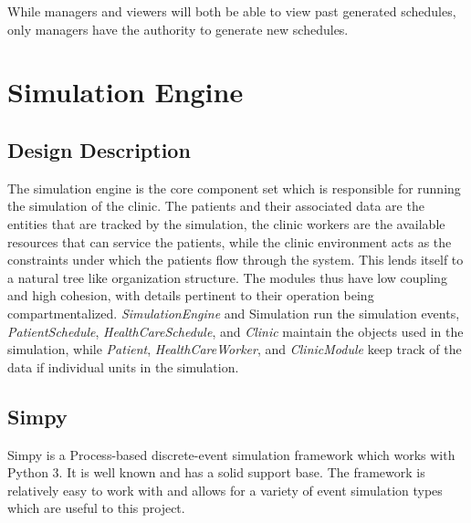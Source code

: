 \documentclass[12pt]{article}
\begin{document}
\noindent \newline
While managers and viewers will both be able to view past generated schedules, only managers have the authority to generate new schedules.




\section{Simulation Engine}

\subsection{Design Description}
The simulation engine is the core component set which is responsible for running the simulation of the clinic. The patients and their associated data are the entities that are tracked by the simulation, the clinic workers are the available resources that can service the patients, while the clinic environment acts as the constraints under which the patients flow through the system. This lends itself to a natural tree like organization structure. The modules thus have low coupling and high cohesion, with details pertinent to their operation being compartmentalized. \textit{SimulationEngine} and Simulation run the simulation events, \textit{PatientSchedule},\textit{ HealthCareSchedule}, and \textit{Clinic} maintain the objects used in the simulation, while \textit{Patient}, \textit{HealthCareWorker}, and \textit{ClinicModule} keep track of the data if individual units in the simulation.

\subsection{Simpy}
Simpy is a Process-based discrete-event simulation framework which works with Python 3. It is well known and has a solid support base. The framework is relatively easy to work with and allows for a variety of event simulation types which are useful to this project. 
\end{document}
